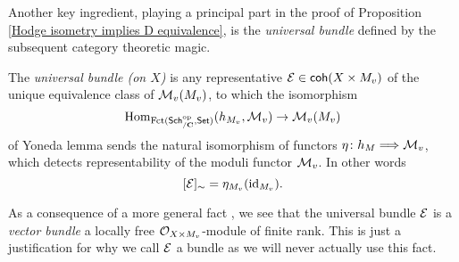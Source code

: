 Another key ingredient, playing a principal part in the proof of Proposition \ref{Hodge isometry implies D equivalence}, is the \emph{universal bundle} defined by the subsequent category theoretic magic.


\begin{definition}
    The \emph{universal bundle (on $X$)} is any representative $\mathcal E \in \mathsf{coh}(X \times M_v)$ of the unique equivalence class of $\mathcal M_v(M_v)$, to which the isomorphism 
    \[
        \mathrm{Hom}_{\operatorname{Fct(\mathsf{Sch}_{/\mathbf C}^{\text{op}}, \mathsf{Set})}}(h_{M_v}, \mathcal M_v) \to \mathcal M_v(M_v)
    \]
    of Yoneda lemma sends the natural isomorphism of functors $\eta \colon h_M \Longrightarrow \mathcal M_v$, which detects representability of the moduli functor $\mathcal M_v$. In other words 
    \[
        [\mathcal E]_\sim = \eta_{M_v}(\operatorname{id}_{{M_v}}).
    \]
\end{definition}

\begin{remark}
    As a consequence of a more general fact \cite[\S 6.1, Remark 6.1.9]{HuybrechtsLehn2010}, we see that the universal bundle $\mathcal E$ is a \emph{vector bundle} \ie a locally free ${\mathcal{O}_{X \times M_v}}$-module of finite rank. This is just a justification for why we call $\mathcal E$ a bundle as we will never actually use this fact. 
\end{remark}


